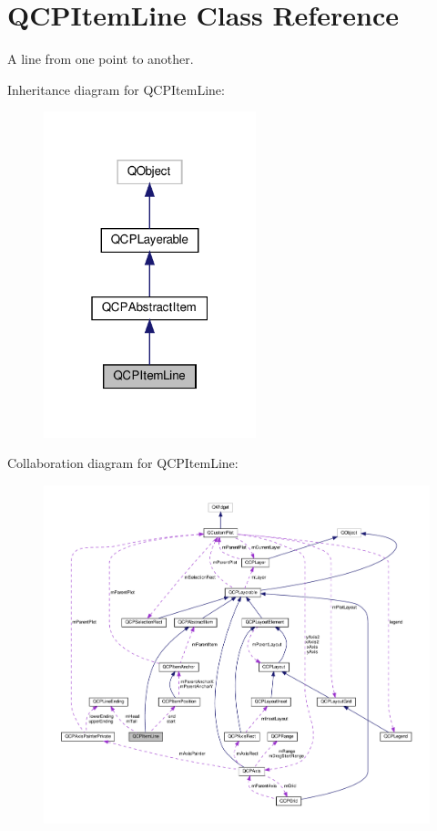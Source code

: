 \hypertarget{classQCPItemLine}{}\section{Q\+C\+P\+Item\+Line Class Reference}
\label{classQCPItemLine}


A line from one point to another.  




Inheritance diagram for Q\+C\+P\+Item\+Line\+:\nopagebreak
\begin{figure}[H]
\begin{center}
\leavevmode
\includegraphics[width=175pt]{classQCPItemLine__inherit__graph}
\end{center}
\end{figure}


Collaboration diagram for Q\+C\+P\+Item\+Line\+:\nopagebreak
\begin{figure}[H]
\begin{center}
\leavevmode
\includegraphics[width=350pt]{classQCPItemLine__coll__graph}
\end{center}
\end{figure}
